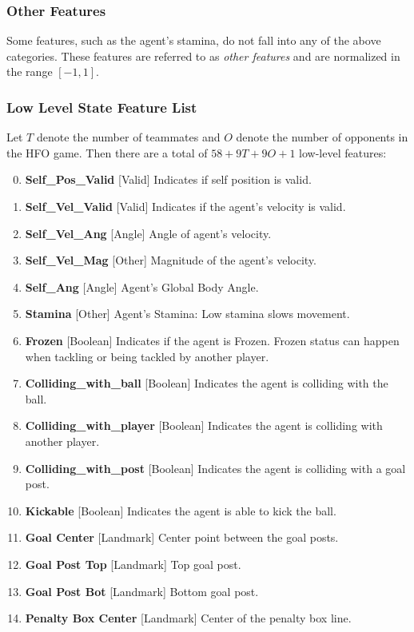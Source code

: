 \documentclass[12pt]{article}
\def\itemrange#1{%
\addtocounter{enumi}{1}%
\edef\labelenumi{\theenumi--\noexpand\theenumi}%
\addtocounter{enumi}{-1}%
\addtocounter{enumi}{#1}%
\item
\def\labelenumi{\theenumi}}
\renewcommand*{\labelenumi}{\theenumi}
\begin{document}
\subsubsection{Other Features}
Some features, such as the agent's stamina, do not fall into any of
the above categories. These features are referred to as \textit{other
  features} and are normalized in the range $[-1, 1]$.

\subsubsection{Low Level State Feature List}
Let $T$ denote the number of teammates and $O$ denote the number of
opponents in the HFO game. Then there are a total of $58 + 9T + 9O + 1$
low-level features:

\begin{enumerate}[noitemsep]
\setcounter{enumi}{-1}
  \item{\textbf{Self\_Pos\_Valid} [Valid] Indicates if self position is valid.}
  \item{\textbf{Self\_Vel\_Valid} [Valid] Indicates if the agent's velocity is valid.}
  \itemrange{1}{\textbf{Self\_Vel\_Ang} [Angle] Angle of agent's velocity.}
  \item{\textbf{Self\_Vel\_Mag} [Other] Magnitude of the agent's velocity.}
  \itemrange{1}{\textbf{Self\_Ang} [Angle] Agent's Global Body Angle.}
  \item{\textbf{Stamina} [Other] Agent's Stamina: Low stamina slows movement.}
  \item{\textbf{Frozen} [Boolean] Indicates if the agent is Frozen. Frozen status can
    happen when tackling or being tackled by another player.}
  \item{\textbf{Colliding\_with\_ball} [Boolean] Indicates the agent
    is colliding with the ball.}
  \item{\textbf{Colliding\_with\_player} [Boolean] Indicates the agent
    is colliding with another player.}
  \item{\textbf{Colliding\_with\_post} [Boolean] Indicates the agent
    is colliding with a goal post.}
  \item{\textbf{Kickable} [Boolean] Indicates the agent is able to
    kick the ball.}
  \itemrange{2}{\textbf{Goal Center} [Landmark] Center point between the goal posts.}
  \itemrange{2}{\textbf{Goal Post Top} [Landmark] Top goal post.}
  \itemrange{2}{\textbf{Goal Post Bot} [Landmark] Bottom goal post.}
  \itemrange{2}{\textbf{Penalty Box Center} [Landmark] Center of the penalty box line.}

\end{enumerate}
\end{document}
